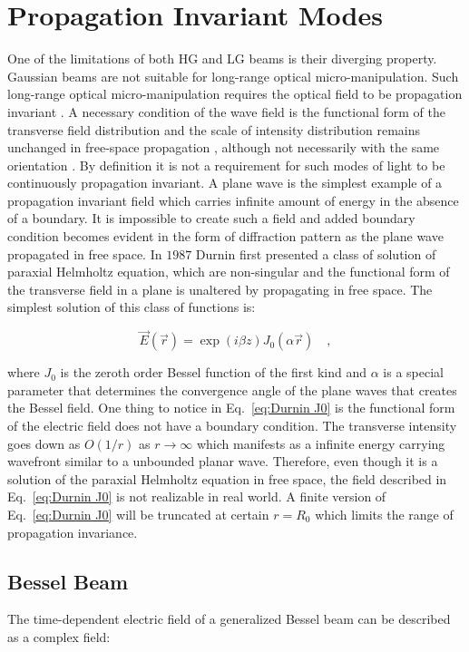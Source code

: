 \section{Propagation Invariant Modes}

One of the limitations of both HG and LG beams is their diverging property. Gaussian beams are not suitable for long-range optical micro-manipulation. Such long-range optical micro-manipulation requires the optical field to be propagation invariant \cite{TURUNEN20101}. A necessary condition of the wave field is the functional form of the transverse field distribution and the scale of intensity distribution remains unchanged in free-space propagation \cite{bouchal1996}, although not necessarily with the same orientation \cite{Piestun:98}. By definition it is not a requirement for such modes of light to be continuously propagation invariant. A plane wave is the simplest example of a propagation invariant field which carries infinite amount of energy in the absence of a boundary. It is impossible to create such a field and added boundary condition becomes evident in the form of diffraction pattern as the plane wave propagated in free space. In $1987$ Durnin \cite{Durnin:87} first presented a class of solution of paraxial Helmholtz  equation, which are non-singular and the functional form of the transverse field in a plane is unaltered by propagating in free space. The simplest solution of this class of functions is:

\begin{equation}
\label{eq:Durnin J0}
\vec{E}(\vec{r}) = \exp (i\beta z)J_{0}(\alpha \vec{r}) \quad ,
\end{equation}

where $J_0$ is the zeroth order Bessel function of the first kind and $\alpha$ is a special parameter that determines the convergence angle of the plane waves that creates the Bessel field. One thing to notice in Eq.~\eqref{eq:Durnin J0} is the functional form of the electric field does not have a boundary condition. The transverse intensity goes down as $O(1/r)$ as $r\rightarrow \infty$ which manifests as a infinite energy carrying wavefront similar to a unbounded planar wave. Therefore, even though it is a solution of the paraxial Helmholtz equation in free space, the field described in Eq.~\eqref{eq:Durnin J0} is not realizable in real world. A finite version of Eq.~\eqref{eq:Durnin J0} will be truncated at certain $r = R_0$ which limits the range of propagation invariance.

\subsection{Bessel Beam}
\label{subsec:Bessel Beam}
The time-dependent electric field of a generalized Bessel beam \cite{bouchal1996, mcgloin2005} can be described as a complex field:

